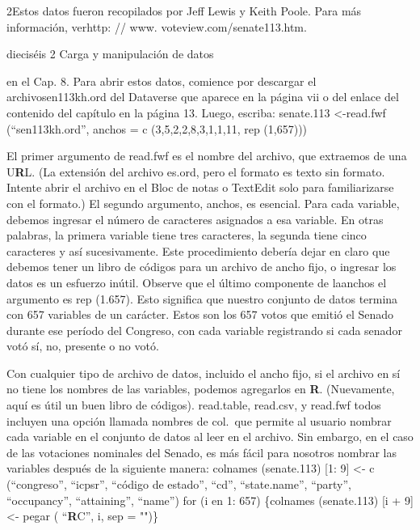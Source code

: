 \documentclass[
]{book}
\begin{document}
2Estos datos fueron recopilados por Jeff Lewis y Keith Poole. Para más información, verhttp: // www. voteview.com/senate113.htm.

dieciséis 2 Carga y manipulación de datos

en el Cap. 8. Para abrir estos datos, comience por descargar el archivosen113kh.ord del Dataverse que aparece en la página vii o del enlace del contenido del capítulo en la página 13. Luego, escriba:
senate.113 \textless-read.fwf (``sen113kh.ord'',
anchos = c (3,5,2,2,8,3,1,1,11, rep (1,657)))

El primer argumento de read.fwf es el nombre del archivo, que extraemos de una U\textbf{R}L. (La extensión del archivo es.ord, pero el formato es texto sin formato. Intente abrir el archivo en el Bloc de notas o TextEdit solo para familiarizarse con el formato.) El segundo argumento, anchos, es esencial. Para cada variable, debemos ingresar el número de caracteres asignados a esa variable. En otras palabras, la primera variable tiene tres caracteres, la segunda tiene cinco caracteres y así sucesivamente. Este procedimiento debería dejar en claro que debemos tener un libro de códigos para un archivo de ancho fijo, o ingresar los datos es un esfuerzo inútil. Observe que el último componente de laanchos el argumento es rep (1.657). Esto significa que nuestro conjunto de datos termina con 657 variables de un carácter. Estos son los 657 votos que emitió el Senado durante ese período del Congreso, con cada variable registrando si cada senador votó sí, no, presente o no votó.

Con cualquier tipo de archivo de datos, incluido el ancho fijo, si el archivo en sí no tiene los nombres de las variables, podemos agregarlos en \textbf{R}. (Nuevamente, aquí es útil un buen libro de códigos). read.table, read.csv, y read.fwf todos incluyen una opción llamada nombres de col.~que permite al usuario nombrar cada variable en el conjunto de datos al leer en el archivo. Sin embargo, en el caso de las votaciones nominales del Senado, es más fácil para nosotros nombrar las variables después de la siguiente manera:
colnames (senate.113) {[}1: 9{]} \textless- c (``congreso'', ``icpsr'', ``código de estado'',
``cd'', ``state.name'', ``party'', ``occupancy'', ``attaining'', ``name'') for (i en 1: 657)
\{colnames (senate.113) {[}i + 9{]} \textless- pegar ( ``\textbf{R}C'', i, sep = "")\}
\end{document}
